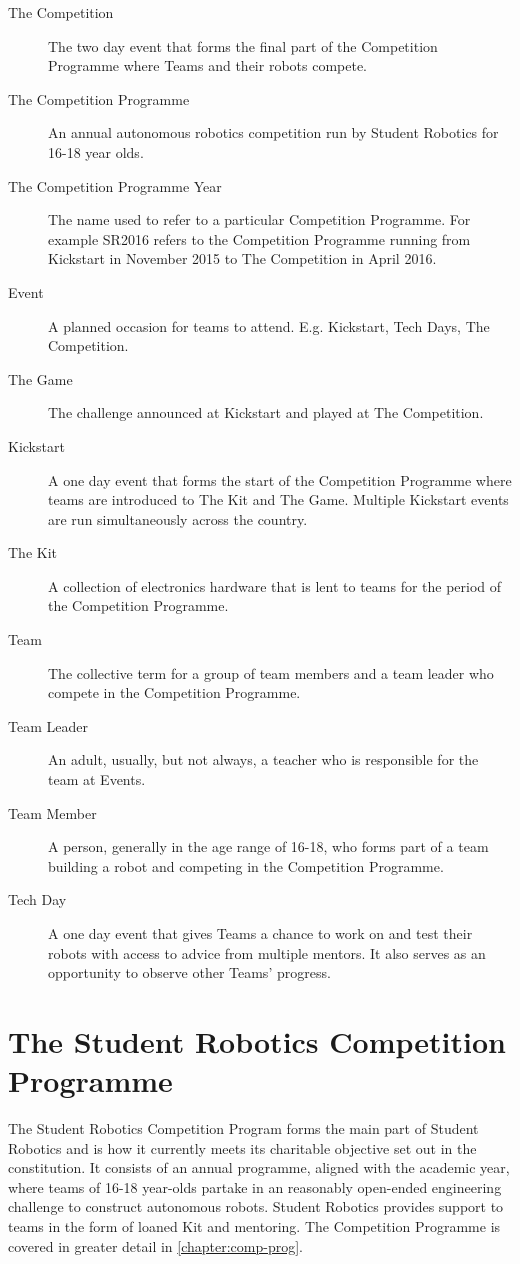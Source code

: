 \begin{description}
  \item[The Competition] The two day event that forms the final part of the Competition Programme where Teams and their robots compete.
  \item[The Competition Programme] An annual autonomous robotics competition run by Student Robotics for 16-18 year olds.
  \item[The Competition Programme Year] The name used to refer to a particular Competition Programme. For example SR2016 refers to the Competition Programme running from Kickstart in November 2015 to The Competition in April 2016.
  \item[Event] A planned occasion for teams to attend. E.g. Kickstart, Tech Days, The Competition.
  \item[The Game] The challenge announced at Kickstart and played at The Competition.
  \item[Kickstart] A one day event that forms the start of the Competition Programme where teams are introduced to The Kit and The Game. Multiple Kickstart events are run simultaneously across the country.
  \item[The Kit] A collection of electronics hardware that is lent to teams for the period of the Competition Programme.
  \item[Team] The collective term for a group of team members and a team leader who compete in the Competition Programme.
  \item[Team Leader] An adult, usually, but not always, a teacher who is responsible for the team at Events.
  \item[Team Member] A person, generally in the age range of 16-18, who forms part of a team building a robot and competing in the Competition Programme.
  \item[Tech Day] A one day event that gives Teams a chance to work on and test their robots with access to advice from multiple mentors. It also serves as an opportunity to observe other Teams' progress.
\end{description}

\section{The Student Robotics Competition Programme}

The Student Robotics Competition Program forms the main part of Student Robotics and is how it currently meets its charitable objective set out in the constitution. It consists of an annual programme, aligned with the academic year, where teams of 16-18 year-olds partake in an reasonably open-ended engineering challenge to construct autonomous robots. Student Robotics provides support to teams in the form of loaned Kit and mentoring. The Competition Programme is covered in greater detail in \autoref{chapter:comp-prog}.

